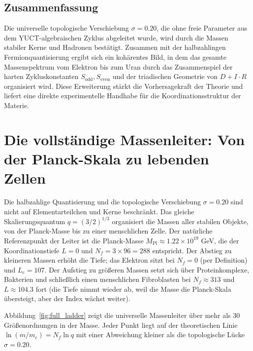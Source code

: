 \documentclass[12pt,a4paper]{article}
\begin{document}
	\subsection{Zusammenfassung}
	
	Die universelle topologische Verschiebung \(\sigma = 0.20\), die ohne freie Parameter aus dem YUCT-algebraischen Zyklus abgeleitet wurde, wird durch die Massen stabiler Kerne und Hadronen bestätigt. Zusammen mit der halbzahlingen Fermionquantisierung ergibt sich ein kohärentes Bild, in dem das gesamte Massenspektrum vom Elektron bis zum Uran durch das Zusammenspiel der harten Zykluskonstanten \(S_{\mathrm{odd}}, S_{\mathrm{even}}\) und der triadischen Geometrie von \(D+I\cdot R\) organisiert wird. Diese Erweiterung stärkt die Vorhersagekraft der Theorie und liefert eine direkte experimentelle Handhabe für die Koordinationsstruktur der Materie.
	
	\section{Die vollständige Massenleiter: Von der Planck-Skala zu lebenden Zellen}
	\label{sec:complete_ladder}
	
	Die halbzahlige Quantisierung und die topologische Verschiebung \(\sigma = 0.20\) sind nicht auf Elementarteilchen und Kerne beschränkt. Das gleiche Skalierungsquantum \(q = (3/2)^{1/3}\) organisiert die Massen aller stabilen Objekte, von der Planck-Masse bis zu einer menschlichen Zelle. Der natürliche Referenzpunkt der Leiter ist die Planck-Masse \(M_{\mathrm{Pl}} \approx 1.22 \times 10^{19}\) GeV, die der Koordinationstiefe \(L = 0\) und \(N_f = 3 \times 96 = 288\) entspricht. Der Abstieg zu kleineren Massen erhöht die Tiefe; das Elektron sitzt bei \(N_f = 0\) (per Definition) und \(L_e = 107\). Der Aufstieg zu größeren Massen setzt sich über Proteinkomplexe, Bakterien und schließlich einen menschlichen Fibroblasten bei \(N_f \approx 313\) und \(L \approx 104.3\) fort (die Tiefe nimmt wieder ab, weil die Masse die Planck-Skala übersteigt, aber der Index wächst weiter).
	
	Abbildung~\ref{fig:full_ladder} zeigt die universelle Massenleiter über mehr als 30 Größenordnungen in der Masse. Jeder Punkt liegt auf der theoretischen Linie \(\ln(m/m_e) = N_f \ln q\) mit einer Abweichung kleiner als die topologische Lücke \(\sigma = 0.20\).
	
\end{document}
